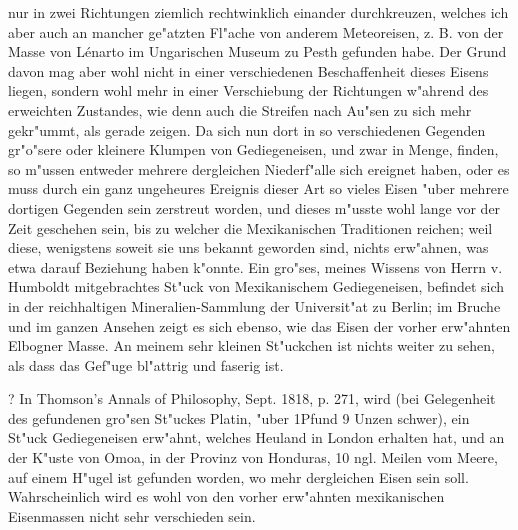 \documentclass[a4paper, 11pt, oneside, polutonikogreek, german]{article}
\begin{document}
nur in zwei Richtungen ziemlich rechtwinklich einander durchkreuzen, welches ich aber auch an mancher ge"atzten Fl"ache von anderem Meteoreisen, z. B. von der Masse von Lénarto im Ungarischen Museum zu Pesth gefunden habe. Der Grund davon mag aber wohl nicht in einer verschiedenen Beschaffenheit dieses Eisens liegen, sondern wohl mehr in einer Verschiebung der Richtungen w"ahrend des erweichten Zustandes, wie denn auch die Streifen nach Au"sen zu sich mehr gekr"ummt, als gerade zeigen. Da sich nun dort in so verschiedenen Gegenden gr"o"sere oder kleinere Klumpen von Gediegeneisen, und zwar in Menge, finden, so m"ussen entweder mehrere dergleichen Niederf"alle sich ereignet haben, oder es muss durch ein ganz ungeheures Ereignis dieser Art so vieles Eisen "uber mehrere dortigen Gegenden sein zerstreut worden, und dieses m"usste wohl lange vor der Zeit geschehen sein, bis zu welcher die Mexikanischen Traditionen reichen; weil diese, wenigstens soweit sie uns bekannt geworden sind, nichts erw"ahnen, was etwa darauf Beziehung haben k"onnte. Ein gro"ses, meines Wissens von Herrn v. Humboldt mitgebrachtes St"uck von Mexikanischem Gediegeneisen, befindet sich in der reichhaltigen Mineralien-Sammlung der Universit"at zu Berlin; im Bruche und im ganzen Ansehen zeigt es sich ebenso, wie das Eisen der vorher erw"ahnten Elbogner Masse. An meinem sehr kleinen St"uckchen ist nichts weiter zu sehen, als dass das Gef"uge bl"attrig und faserig ist.

? In Thomson's Annals of Philosophy, Sept. 1818, p. 271, wird (bei Gelegenheit des gefundenen gro"sen St"uckes Platin, "uber 1Pfund 9 Unzen schwer), ein St"uck Gediegeneisen erw"ahnt, welches Heuland in London erhalten hat, und an der K"uste von Omoa, in der Provinz von Honduras, 10 ngl. Meilen vom Meere, auf einem H"ugel ist gefunden worden, wo mehr dergleichen Eisen sein soll. Wahrscheinlich wird es wohl von den vorher erw"ahnten mexikanischen Eisenmassen nicht sehr verschieden sein.
\end{document}
